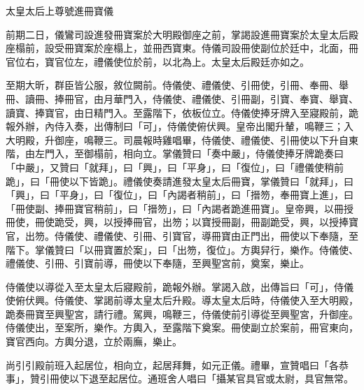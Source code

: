 \begin{pinyinscope}
 太皇太后上尊號進冊寶儀



 前期二日，儀鸞司設進發冊寶案於大明殿御座之前，掌謁設進冊寶案於太皇太后殿座榻前，設受冊寶案於座榻上，並冊西寶東。侍儀司設冊使副位於廷中，北面，冊官位右，寶官位左，禮儀使位於前，以北為上。太皇太后殿廷亦如之。



 至期大昕，群臣皆公服，敘位闕前。侍儀使、禮儀使、引冊使，引冊、奉冊、舉冊、讀冊、捧冊官，由月華門入，侍儀使、禮儀使、引冊副，引寶、奉寶、舉寶、讀寶、捧寶官，由日精門入。至露階下，依板位立。侍儀使捧牙牌入至寢殿前，跪報外辦，內侍入奏，出傳制曰「可」，侍儀使俯伏興。皇帝出閣升輦，鳴鞭三；入大明殿，升御座，鳴鞭三。司晨報時雞唱畢，侍儀使、禮儀使、引冊使以下升自東階，由左門入，至御榻前，相向立。掌儀贊曰「奏中嚴」，侍儀使捧牙牌跪奏曰「中嚴」，又贊曰「就拜」，曰「興」，曰「平身」，曰「復位」，曰「禮儀使稍前跪」，曰「冊使以下皆跪」。禮儀使奏請進發太皇太后冊寶，掌儀贊曰「就拜」，曰「興」，曰「平身」，曰「復位」，曰「內謁者稍前」，曰「搢笏，奉冊寶上進」，曰「冊使副、捧冊寶官稍前」，曰「搢笏」，曰「內謁者跪進冊寶」。皇帝興，以冊授冊使，冊使跪受，興，以授捧冊官，出笏；以寶授冊副，冊副跪受，興，以授捧寶官，出笏。侍儀使、禮儀使、引冊、引寶官，導冊寶由正門出，冊使以下奉隨，至階下。掌儀贊曰「以冊寶置於案」，曰「出笏，復位」。方輿舁行，樂作。侍儀使、禮儀使、引冊、引寶前導，冊使以下奉隨，至興聖宮前，奠案，樂止。



 侍儀使以導從入至太皇太后寢殿前，跪報外辦。掌謁入啟，出傳旨曰「可」，侍儀使俯伏興。侍儀使、掌謁前導太皇太后升殿。導太皇太后時，侍儀使入至大明殿，跪奏冊寶至興聖宮，請行禮。駕興，鳴鞭三，侍儀使前引導從至興聖宮，升御座。侍儀使出，至案所，樂作。方輿入，至露階下奠案。冊使副立於案前，冊官東向，寶官西向。方輿分退，立於兩廡，樂止。



 尚引引殿前班入起居位，相向立，起居拜舞，如元正儀。禮畢，宣贊唱曰「各恭事」，贊引冊使以下退至起居位。通班舍人唱曰「攝某官具官或太尉，具官無常。




\end{pinyinscope}
